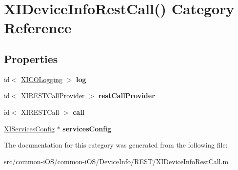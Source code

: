 \hypertarget{category_x_i_device_info_rest_call_07_08}{}\section{X\+I\+Device\+Info\+Rest\+Call() Category Reference}
\label{category_x_i_device_info_rest_call_07_08}
\subsection*{Properties}
\begin{DoxyCompactItemize}
\item 
\hypertarget{category_x_i_device_info_rest_call_07_08_a81294f40f6d7d6bffad6fb07393af918}{}\label{category_x_i_device_info_rest_call_07_08_a81294f40f6d7d6bffad6fb07393af918} 
id$<$ \hyperlink{protocol_x_i_c_o_logging-p}{X\+I\+C\+O\+Logging} $>$ {\bfseries log}
\item 
\hypertarget{category_x_i_device_info_rest_call_07_08_a59cfbc28d3d8de935643a7e78f9c776e}{}\label{category_x_i_device_info_rest_call_07_08_a59cfbc28d3d8de935643a7e78f9c776e} 
id$<$ X\+I\+R\+E\+S\+T\+Call\+Provider $>$ {\bfseries rest\+Call\+Provider}
\item 
\hypertarget{category_x_i_device_info_rest_call_07_08_a444f844f5e2157bab241008483461c4e}{}\label{category_x_i_device_info_rest_call_07_08_a444f844f5e2157bab241008483461c4e} 
id$<$ X\+I\+R\+E\+S\+T\+Call $>$ {\bfseries call}
\item 
\hypertarget{category_x_i_device_info_rest_call_07_08_a8ebf69fcf7d6f6883a5eb2bea8407252}{}\label{category_x_i_device_info_rest_call_07_08_a8ebf69fcf7d6f6883a5eb2bea8407252} 
\hyperlink{interface_x_i_services_config}{X\+I\+Services\+Config} $\ast$ {\bfseries services\+Config}
\end{DoxyCompactItemize}


The documentation for this category was generated from the following file\+:\begin{DoxyCompactItemize}
\item 
src/common-\/i\+O\+S/common-\/i\+O\+S/\+Device\+Info/\+R\+E\+S\+T/X\+I\+Device\+Info\+Rest\+Call.\+m\end{DoxyCompactItemize}
